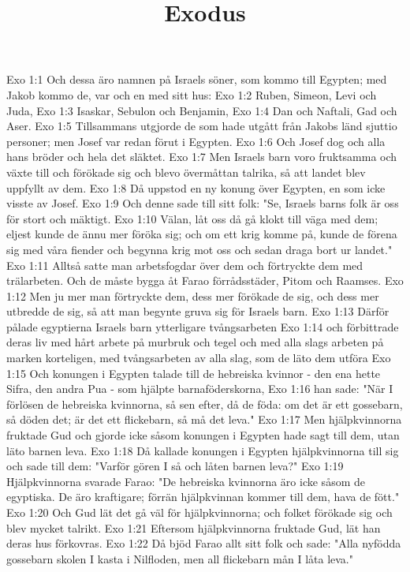 

\title{Exodus}

Exo 1:1  Och dessa äro namnen på Israels söner, som kommo till Egypten; med Jakob kommo de, var och en med sitt hus:
Exo 1:2  Ruben, Simeon, Levi och Juda,
Exo 1:3  Isaskar, Sebulon och Benjamin,
Exo 1:4  Dan och Naftali, Gad och Aser.
Exo 1:5  Tillsammans utgjorde de som hade utgått från Jakobs länd sjuttio personer; men Josef var redan förut i Egypten.
Exo 1:6  Och Josef dog och alla hans bröder och hela det släktet.
Exo 1:7  Men Israels barn voro fruktsamma och växte till och förökade sig och blevo övermåttan talrika, så att landet blev uppfyllt av dem.
Exo 1:8  Då uppstod en ny konung över Egypten, en som icke visste av Josef.
Exo 1:9  Och denne sade till sitt folk: "Se, Israels barns folk är oss för stort och mäktigt.
Exo 1:10  Välan, låt oss då gå klokt till väga med dem; eljest kunde de ännu mer föröka sig; och om ett krig komme på, kunde de förena sig med våra fiender och begynna krig mot oss och sedan draga bort ur landet."
Exo 1:11  Alltså satte man arbetsfogdar över dem och förtryckte dem med trälarbeten. Och de måste bygga åt Farao förrådsstäder, Pitom och Raamses.
Exo 1:12  Men ju mer man förtryckte dem, dess mer förökade de sig, och dess mer utbredde de sig, så att man begynte gruva sig för Israels barn.
Exo 1:13  Därför pålade egyptierna Israels barn ytterligare tvångsarbeten
Exo 1:14  och förbittrade deras liv med hårt arbete på murbruk och tegel och med alla slags arbeten på marken korteligen, med tvångsarbeten av alla slag, som de läto dem utföra
Exo 1:15  Och konungen i Egypten talade till de hebreiska kvinnor - den ena hette Sifra, den andra Pua - som hjälpte barnaföderskorna,
Exo 1:16  han sade: "När I förlösen de hebreiska kvinnorna, så sen efter, då de föda: om det är ett gossebarn, så döden det; är det ett flickebarn, så må det leva."
Exo 1:17  Men hjälpkvinnorna fruktade Gud och gjorde icke såsom konungen i Egypten hade sagt till dem, utan läto barnen leva.
Exo 1:18  Då kallade konungen i Egypten hjälpkvinnorna till sig och sade till dem: "Varför gören I så och låten barnen leva?"
Exo 1:19  Hjälpkvinnorna svarade Farao: "De hebreiska kvinnorna äro icke såsom de egyptiska. De äro kraftigare; förrän hjälpkvinnan kommer till dem, hava de fött."
Exo 1:20  Och Gud lät det gå väl för hjälpkvinnorna; och folket förökade sig och blev mycket talrikt.
Exo 1:21  Eftersom hjälpkvinnorna fruktade Gud, lät han deras hus förkovras.
Exo 1:22  Då bjöd Farao allt sitt folk och sade: "Alla nyfödda gossebarn skolen I kasta i Nilfloden, men all flickebarn mån I låta leva."
